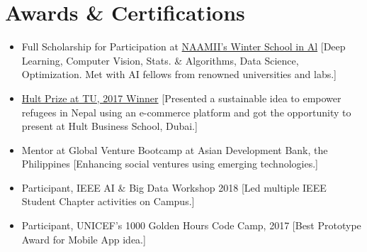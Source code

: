 \documentclass{resume}
\begin{document}
\section{Awards \& Certifications  }
\begin{itemize}
    
\item {Full Scholarship for Participation at \href{https://1nepalschool.naamii.com.np/}{NAAMII's Winter School in Al}}
[Deep Learning, Computer Vision, Stats. \& Algorithms, Data Science, Optimization. Met with AI fellows from renowned universities and labs.] 


\item {\href{https://glocalkhabar.com/hult-prize-tu-winner-team-aegis-social-entrepreneurship/}{Hult Prize at TU, 2017 Winner}}
[Presented a sustainable idea to empower refugees in Nepal using an e-commerce platform and got the opportunity to present at Hult Business School, Dubai.]

\item {Mentor at Global Venture Bootcamp at Asian Development Bank, the Philippines}
[Enhancing social ventures using emerging technologies.]

\item {Participant, IEEE AI \& Big Data Workshop 2018}
[Led multiple IEEE Student Chapter activities on Campus.]

\item{Participant, UNICEF's 1000 Golden Hours Code Camp, 2017}
[Best Prototype Award for Mobile App idea.]
\end{itemize}

\vspace{5mm}
\end{document}
